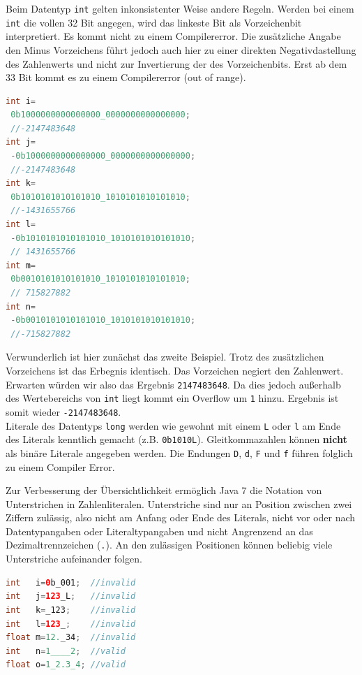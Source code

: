 \documentclass[times, 10pt,twocolumn]{article}
\begin{document}
Beim Datentyp \texttt{int} gelten inkonsistenter Weise andere Regeln. Werden bei einem \texttt{int} die vollen 32 Bit angegen, wird das linkeste Bit als Vorzeichenbit interpretiert. Es kommt nicht zu einem Compilererror. Die zusätzliche Angabe den Minus Vorzeichens führt jedoch auch hier zu einer direkten Negativdastellung des Zahlenwerts und nicht zur Invertierung der des Vorzeichenbits. Erst ab dem 33 Bit kommt es zu einem Compilererror (out of range).
\begin{lstlisting}[language=java,breaklines=true]
int i=
 0b1000000000000000_0000000000000000;
 //-2147483648
int j=
 -0b1000000000000000_0000000000000000;
 //-2147483648
int k=
 0b1010101010101010_1010101010101010;
 //-1431655766
int l=
 -0b1010101010101010_1010101010101010;
 // 1431655766
int m=
 0b0010101010101010_1010101010101010;
 // 715827882
int n=
 -0b0010101010101010_1010101010101010;
 //-715827882
\end{lstlisting}

Verwunderlich ist hier zunächst das zweite Beispiel. Trotz des zusätzlichen Vorzeichens ist das Erbegnis identisch. Das Vorzeichen negiert den Zahlenwert. Erwarten würden wir also das Ergebnis \texttt{2147483648}. Da dies jedoch außerhalb des Wertebereichs von \texttt{int} liegt kommt ein Overflow um \texttt{1} hinzu. Ergebnis ist somit wieder \texttt{-2147483648}.\\

Literale des Datentyps \texttt{long} werden wie gewohnt mit einem \texttt{L} oder \texttt{l} am Ende des Literals kenntlich gemacht (z.B. \texttt{0b1010L}). Gleitkommazahlen können \textbf{nicht} als binäre Literale angegeben werden. Die Endungen \texttt{D}, \texttt{d}, \texttt{F} und \texttt{f} führen folglich zu einem Compiler Error.

Zur Verbesserung der Übersichtlichkeit ermöglich Java 7 die Notation von Unterstrichen in Zahlenliteralen. Unterstriche sind nur an Position zwischen zwei Ziffern zulässig, also nicht am Anfang oder Ende des Literals, nicht vor oder nach Datentypangaben oder Literaltypangaben und nicht Angrenzend an das Dezimaltrennzeichen (\texttt{.}).\cite{apressjava} An den zulässigen Positionen können beliebig viele Unterstriche aufeinander folgen.\cite{heiseWasistNeu}

\begin{lstlisting}[language=java,breaklines=true]
int   i=0b_001;  //invalid
int   j=123_L;   //invalid
int   k=_123;    //invalid
int   l=123_;    //invalid
float m=12._34;  //invalid
int   n=1____2;  //valid
float o=1_2.3_4; //valid
\end{lstlisting}
\end{document}
